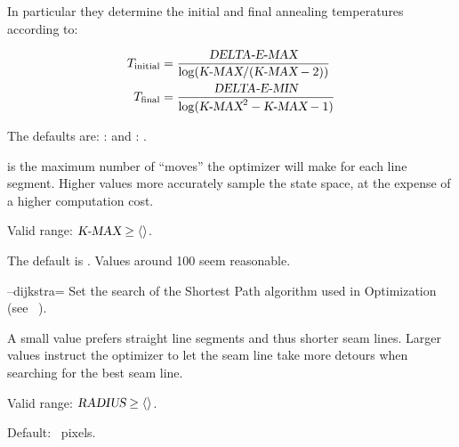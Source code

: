 \begin{codelist}
\begin{codelist}
    In particular they determine the initial and final annealing temperatures according to:

    \begin{align*}
      T_{\mathrm{initial}} &= \frac{\textsl{DELTA-E-MAX}}{\log(\textsl{K-MAX} / (\textsl{K-MAX} - 2))} \\
      T_{\mathrm{final}} &= \frac{\textsl{DELTA-E-MIN}}{\log(\textsl{K-MAX}^2 - \textsl{K-MAX} - 1)}
    \end{align*}

    The defaults are: :  and
    : .

  \item[\metavar{K-MAX}]\itemend {} is the maximum number of ``moves'' the
    optimizer will make for each line segment.  Higher values more accurately sample the state
    space, at the expense of a higher computation cost.

    Valid range: $\metavar{K-MAX} \geq \val{val:minimum-anneal-kmax}$.

    The default is .  Values around 100 seem reasonable.
  \end{codelist}


  \label{opt:dijkstra}%
\item[--dijkstra=\metavar{RADIUS}]\itemend
  Set the search  of the  Shortest Path algorithm used in
   Optimization (see \tableName~).

  A small value prefers straight line segments and thus shorter seam lines.  Larger values
  instruct the optimizer to let the seam line take more detours when searching for the best seam
  line.

  Valid range: $\metavar{RADIUS} \geq \val{val:minimum-dijkstra-radius}$.

  Default: ~pixels.


  \label{opt:image-difference}%
\item[\itempar{--image-difference=\metavar{ALGORITHM}\optional{:\feasiblebreak
      \metavar{LUMINANCE-WEIGHT}\optional{:
        \feasiblebreak\metavar{CHROMINANCE-WEIGHT}}}}]\itemend


\end{codelist}
